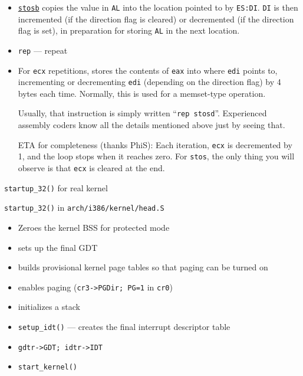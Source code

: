 \begin{itemize}
\item \href{http://www.cs.ubbcluj.ro/\char`~dadi/ac/doc/ng1d5fc.html}{\texttt{stosb}} copies the
  value in \texttt{AL} into the location pointed to by \texttt{ES:DI}. \texttt{DI} is then
  incremented (if the direction flag is cleared) or decremented (if the direction flag is
  set), in preparation for storing \texttt{AL} in the next location.
\item \texttt{rep} --- repeat
\item For \texttt{ecx} repetitions, stores the contents of \texttt{eax} into where \texttt{edi}
  points to, incrementing or decrementing \texttt{edi} (depending on the direction flag) by
  4 bytes each time. Normally, this is used for a memset-type operation.

  Usually, that instruction is simply written ``\texttt{rep stosd}''. Experienced assembly
  coders know all the details mentioned above just by seeing that. \good{}%

  ETA for completeness (thanks PhiS): Each iteration, \texttt{ecx} is decremented by 1, and
  the loop stops when it reaches zero. For \texttt{stos}, the only thing you will observe is
  that \texttt{ecx} is cleared at the end. 
\end{itemize}

\begin{frame}{\texttt{startup\_32()} for real kernel}
  \begin{block}{\texttt{startup\_32()} in \texttt{arch/i386/kernel/head.S}}
    \begin{itemize}
    \item Zeroes the kernel BSS for protected mode
    \item sets up the final GDT
    \item builds provisional kernel page tables so that paging can be turned on
    \item enables paging (\texttt{cr3->PGDir; PG=1} in \texttt{cr0})
    \item initializes a stack
    \item \texttt{setup\_idt()} --- creates the final interrupt descriptor table
    \item \texttt{gdtr->GDT; idtr->IDT}
    \item \texttt{start\_kernel()}
    \end{itemize}
  \end{block}
\end{frame}

